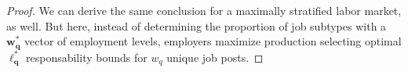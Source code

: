 \documentclass[hidelinks, nonatbib]{elsarticle}
\begin{document}
\begin{lemma}
\begin{proof}
        
        We can derive the same conclusion for a maximally stratified labor market, as well. But here, instead of determining the proportion of job subtypes with a $\boldsymbol{w_{q}^{*}}$ vector of employment levels, employers maximize production selecting optimal $\boldsymbol{\ell_{q}^{*}}$ responsability bounds for $w_q$ unique job posts.
        

\end{proof}
\end{lemma}
\end{document}
